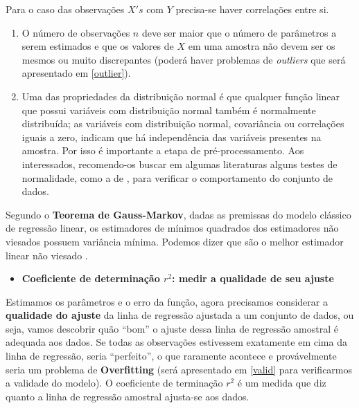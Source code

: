 \documentclass[
]{book}
\providecommand{\tightlist}{%
  \setlength{\itemsep}{0pt}\setlength{\parskip}{0pt}}
\begin{document}
Para o caso das observações \(X's\) com \(Y\) precisa-se haver correlações entre si.

\begin{enumerate}
\def\labelenumi{\arabic{enumi}.}
\setcounter{enumi}{4}
\item
  O número de observações \(n\) deve ser maior que o número de parâmetros a serem estimados e que os valores de \(X\) em uma amostra não devem ser os mesmos ou muito discrepantes (poderá haver problemas de \emph{outliers} que será apresentado em \ref{outlier}).
\item
  Uma das propriedades da distribuição normal é que qualquer função linear que possui variáveis com distribuição normal também é normalmente distribuída; as variáveis com distribuição normal, covariância ou correlações iguais a zero, indicam que há independência das variáveis presentes na amostra. Por isso é importante a etapa de pré-processamento. Aos interessados, recomendo-os buscar em algumas literaturas alguns testes de normalidade, como a de \citep{shapiro1965analysis}, para verificar o comportamento do conjunto de dados.
\end{enumerate}

Segundo o \textbf{Teorema de Gauss-Markov}, dadas as premissas do modelo clássico de regressão linear, os estimadores de mínimos quadrados dos estimadores não viesados possuem variância mínima. Podemos dizer que são o melhor estimador linear não viesado \citep{gujarati2011econometria}.

\begin{itemize}
\tightlist
\item
  \textbf{Coeficiente de determinação \(r^2\): medir a qualidade de seu ajuste}
\end{itemize}

Estimamos os parâmetros e o erro da função, agora precisamos considerar a \textbf{qualidade do ajuste} da linha de regressão ajustada a um conjunto de dados, ou seja, vamos descobrir quão ``bom'' o ajuste dessa linha de regressão
amostral é adequada aos dados. Se todas as observações estivessem exatamente em cima da linha de regressão, seria ``perfeito'', o que raramente acontece e provávelmente seria um problema de \textbf{Overfitting} (será apresentado em \ref{valid} para verificarmos a validade do modelo). O coeficiente de terminação \(r^2\) é um medida que diz quanto a linha de regressão
amostral ajusta-se aos dados.
\end{document}

